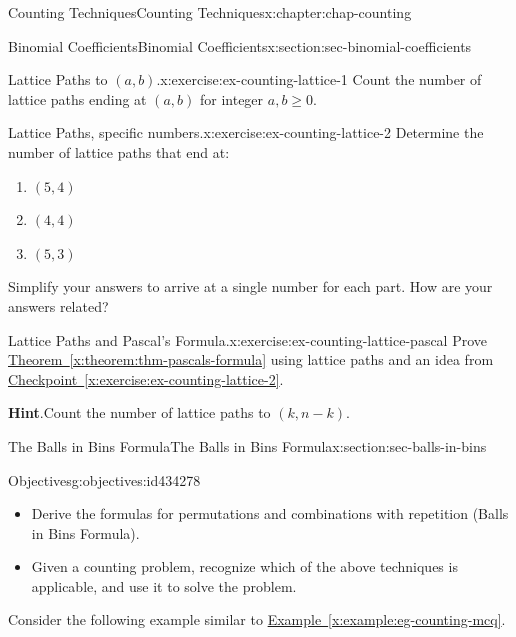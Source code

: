 \documentclass[oneside,10pt,]{book}
\newcommand{\blocktitlefont}{\relax}
\newcommand{\xreffont}{\relax}
\numberwithin{equation}{section}
\begin{document}
\begin{chapterptx}{Counting Techniques}{}{Counting Techniques}{}{}{x:chapter:chap-counting}
\begin{sectionptx}{Binomial Coefficients}{}{Binomial Coefficients}{}{}{x:section:sec-binomial-coefficients}
\begin{inlineexercise}{Lattice Paths to \((a,b)\).}{x:exercise:ex-counting-lattice-1}%
Count the number of lattice paths ending at \((a,b)\) for integer \(a,b \geq 0\).%
\end{inlineexercise}
\begin{inlineexercise}{Lattice Paths, specific numbers.}{x:exercise:ex-counting-lattice-2}%
Determine the number of lattice paths that end at:%
\begin{enumerate}[label=(\alph*)]
\item{}\(\displaystyle (5,4)\)%
\item{}\(\displaystyle (4,4)\)%
\item{}\(\displaystyle (5,3)\)%
\end{enumerate}
Simplify your answers to arrive at a single number for each part. How are your answers related?%
\end{inlineexercise}
\begin{inlineexercise}{Lattice Paths and Pascal's Formula.}{x:exercise:ex-counting-lattice-pascal}%
Prove \hyperref[x:theorem:thm-pascals-formula]{Theorem~{\xreffont\ref{x:theorem:thm-pascals-formula}}} using lattice paths and an idea from \hyperref[x:exercise:ex-counting-lattice-2]{Checkpoint~{\xreffont\ref{x:exercise:ex-counting-lattice-2}}}.%
\par\smallskip%
\noindent\textbf{\blocktitlefont Hint}.\hypertarget{g:hint:id434198}{}\quad{}Count the number of lattice paths to \((k,n-k)\).%
\end{inlineexercise}
\end{sectionptx}
%
%
\typeout{************************************************}
\typeout{************************************************}
%
\begin{sectionptx}{The Balls in Bins Formula}{}{The Balls in Bins Formula}{}{}{x:section:sec-balls-in-bins}
\begin{objectives}{Objectives}{g:objectives:id434278}
%
\begin{itemize}[label=\textbullet]
\item{}Derive the formulas for permutations and combinations with repetition (Balls in Bins Formula).%
\item{}Given a counting problem, recognize which of the above techniques is applicable, and use it to solve the problem.%
\end{itemize}
\end{objectives}
Consider the following example similar to \hyperref[x:example:eg-counting-mcq]{Example~{\xreffont\ref{x:example:eg-counting-mcq}}}.%

\end{sectionptx}
\end{chapterptx}
\end{document}
